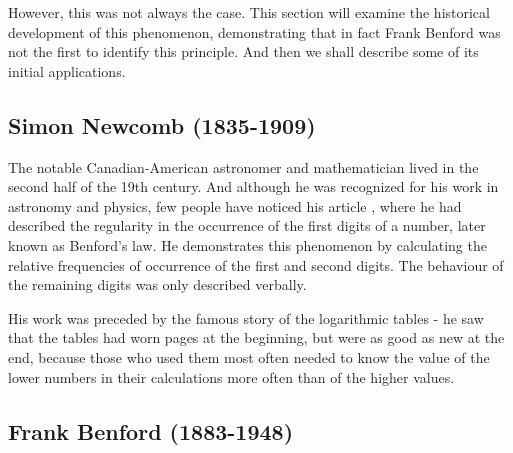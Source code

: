 However, this was not always the case. This section will examine the historical development of this phenomenon, demonstrating that in fact Frank Benford was not the first to identify this principle. And then we shall describe some of its initial applications. 

\subsection{Simon Newcomb (1835-1909)}

The notable Canadian-American astronomer and mathematician lived in the second half of the 19th century. And although he was recognized for his work in astronomy and physics, few people have noticed his article \emph{}, where he had described the regularity in the occurrence of the first digits of a number, later known as Benford's law. He demonstrates this phenomenon by calculating the relative frequencies of occurrence of the first and second digits. The behaviour of the remaining digits was only described verbally.  \cite{kossovsky2014benford} \cite{Newcomb1881} 



His work was preceded by the famous story of the logarithmic tables - he saw that the tables had worn pages at the beginning, but were as good as new at the end, because those who used them most often needed to know the value of the lower numbers in their calculations more often than of the higher values.  \cite{Hronova2023}


\subsection{Frank Benford (1883-1948)}


